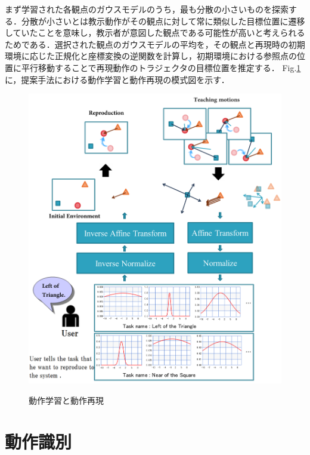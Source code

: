 まず学習された各観点のガウスモデルのうち，最も分散の小さいものを探索する．分散が小さいとは教示動作がその観点に対して常に類似した目標位置に遷移していたことを意味し，教示者が意図した観点である可能性が高いと考えられるためである．選択された観点のガウスモデルの平均を，その観点と再現時の初期環境に応じた正規化と座標変換の逆関数を計算し，初期環境における参照点の位置に平行移動することで再現動作のトラジェクタの目標位置を推定する．
Fig.\ref{figure:learning_and_reproduction_model}に，提案手法における動作学習と動作再現の模式図を示す．
	\begin{figure}[h]
		\begin{center}
			\includegraphics[width=12cm]{chart9.png} \\ %
			\caption{動作学習と動作再現}
			\label{figure:learning_and_reproduction_model}
		\end{center}
	\end{figure}

\section{動作識別}

